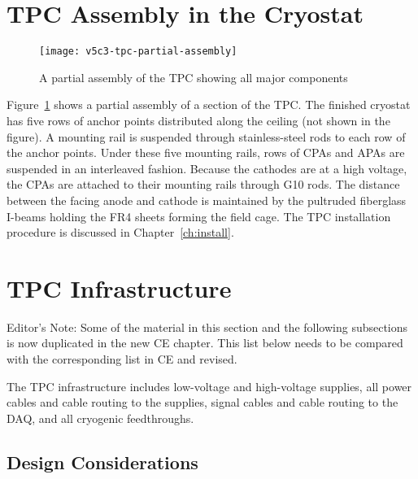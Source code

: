 \section{TPC Assembly in the Cryostat}

\begin{figure}[htbp]
\centering
\texttt{[image: v5c3-tpc-partial-assembly]}
\caption{A partial assembly of the TPC showing all major components}
\label{fig:tpc-partial-assembly}
\end{figure}

Figure~\ref{fig:tpc-partial-assembly} shows a partial assembly of a section of the TPC.
The finished cryostat has five rows of anchor points distributed along the ceiling (not shown in the figure). 
A mounting rail is suspended through stainless-steel rods to each row of the anchor points.  Under these five mounting rails, 
rows of CPAs and APAs are suspended in an interleaved fashion. 
Because the cathodes are at a high voltage, the CPAs are attached to their 
mounting rails through G10 rods. The distance between the facing anode and 
cathode is maintained by the pultruded fiberglass I-beams holding the FR4 sheets 
forming the field cage.  The TPC installation procedure 
is discussed in Chapter~\ref{ch:install}.

\section{TPC Infrastructure}
\label{sec:v5-tpc-feedthru}

\begin{editornote}
  Editor's Note:  Some of the material in this section and the following subsections is now duplicated in the new CE chapter.
  This list below needs to be compared with the corresponding list in CE and revised.
\end{editornote}
   
The TPC infrastructure includes low-voltage and high-voltage supplies, all power cables and cable routing to the supplies, signal cables and cable routing to the DAQ, and all cryogenic feedthroughs.

\subsection{Design Considerations} 
\label{subsec:v5-tpc-feedthru-reqs-n-specs}

